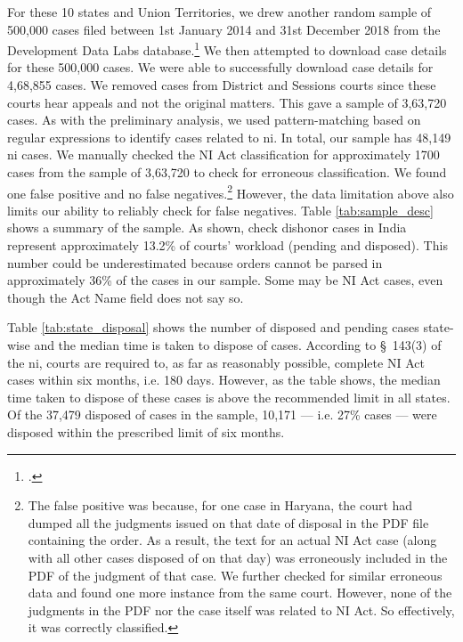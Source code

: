 \documentclass[12pt,a4paper]{article}
\begin{document}
		For these 10 states and Union Territories, we drew another random sample of 500,000 cases filed between 1st January 2014 and 31st December 2018 from the Development Data Labs database.\footcite{devdatalabs2021_eCourtsData} We then attempted to download case details for these 500,000 cases. We were able to successfully download case details for 4,68,855 cases. We removed cases from District and Sessions courts since these courts hear appeals and not the original matters. This gave a sample of 3,63,720 cases. As with the preliminary analysis, we used pattern-matching based on regular expressions to identify cases related to \gls{ni}. In total, our sample has 48,149 \gls{ni} cases. We manually checked the NI Act classification for approximately 1700 cases from the sample of 3,63,720 to check for erroneous classification. We found one false positive and no false negatives.\footnote{The false positive was because, for one case in Haryana, the court had dumped all the judgments issued on that date of disposal in the PDF file containing the order. As a result, the text for an actual NI Act case (along with all other cases disposed of on that day) was erroneously included in the PDF of the judgment of that case. We further checked for similar erroneous data and found one more instance from the same court. However, none of the judgments in the PDF nor the case itself was related to NI Act. So effectively, it was correctly classified.} However, the data limitation above also limits our ability to reliably check for false negatives. Table \ref{tab:sample_desc} shows a summary of the sample. As shown, check dishonor cases in India represent approximately 13.2\% of courts' workload (pending and disposed). This number could be underestimated because orders cannot be parsed in approximately 36\% of the cases in our sample. Some may be NI Act cases, even though the Act Name field does not say so.
		
		Table \ref{tab:state_disposal} shows the number of disposed and pending cases state-wise and the median time is taken to dispose of cases. According to \S~143(3) of the \gls{ni}, courts are required to, as far as reasonably possible, complete NI Act cases within six months, i.e. 180 days. However, as the table shows, the median time taken to dispose of these cases is above the recommended limit in all states. Of the 37,479 disposed of cases in the sample, 10,171 --- i.e. 27\% cases --- were disposed within the prescribed limit of six months.
		
\end{document}
